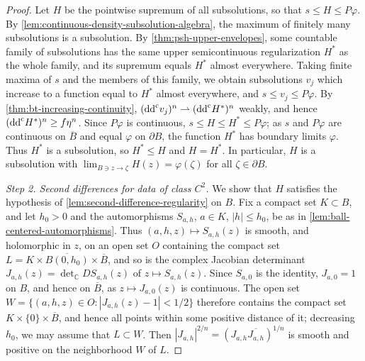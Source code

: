 \begin{proof}
Let $H$ be the pointwise supremum of all subsolutions, so that $s\le H\le P\varphi$. By \cref{lem:continuous-density-subsolution-algebra}, the maximum of finitely many subsolutions is a subsolution. By \cref{thm:psh-upper-envelopes}, some countable family of subsolutions has the same upper semicontinuous regularization $H^*$ as the whole family, and its supremum equals $H^*$ almost everywhere. Taking finite maxima of $s$ and the members of this family, we obtain subsolutions $v_j$ which increase to a function equal to $H^*$ almost everywhere, and $s\le v_j\le P\varphi$. By \cref{thm:bt-increasing-continuity}, $(\mathrm{dd}^{\mathrm{c}} v_j)^n\rightharpoonup(\mathrm{dd}^{\mathrm{c}} H^*)^n$ weakly, and hence $(\mathrm{dd}^{\mathrm{c}} H^*)^n\ge f\eta^n$. Since $P\varphi$ is continuous, $s\le H\le H^*\le P\varphi$; as $s$ and $P\varphi$ are continuous on $\overline B$ and equal $\varphi$ on $\partial B$, the function $H^*$ has boundary limits $\varphi$. Thus $H^*$ is a subsolution, so $H^*\le H$ and $H=H^*$. In particular, $H$ is a subsolution with $\lim_{B\ni z\to\zeta}H(z)=\varphi(\zeta)$ for all $\zeta\in\partial B$.

\emph{Step 2. Second differences for data of class $C^2$.}
We show that $H$ satisfies the hypothesis of \cref{lem:second-difference-regularity} on $B$. Fix a compact set $K\subset B$, and let $h_0>0$ and the automorphisms $S_{a,h}$, $a\in K$, $|h|\le h_0$, be as in \cref{lem:ball-centered-automorphisms}. Thus $(a,h,z)\mapsto S_{a,h}(z)$ is smooth, and holomorphic in $z$, on an open set $O$ containing the compact set $L=K\times\overline{B(0,h_0)}\times\overline B$, and so is the complex Jacobian determinant $J_{a,h}(z)=\det_{\mathbb C}DS_{a,h}(z)$ of $z\mapsto S_{a,h}(z)$. Since $S_{a,0}$ is the identity, $J_{a,0}=1$ on $B$, and hence on $\overline B$, as $z\mapsto J_{a,0}(z)$ is continuous. The open set $W=\{(a,h,z)\in O:|J_{a,h}(z)-1|<1/2\}$ therefore contains the compact set $K\times\{0\}\times\overline B$, and hence all points within some positive distance of it; decreasing $h_0$, we may assume that $L\subset W$. Then $|J_{a,h}|^{2/n}=(J_{a,h}\overline{J_{a,h}})^{1/n}$ is smooth and positive on the neighborhood $W$ of $L$.


\end{proof}
